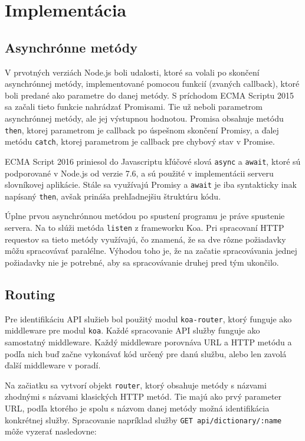 \documentclass[
  digital, %
  table,   %
  lof,     %
  lot,     %
]{fithesis3}
\begin{document}
\section{Implementácia}
\subsection{Asynchrónne metódy}
V prvotných verziách Node.js boli udalosti, ktoré sa volali po skončení asynchrónnej metódy, implementované pomocou funkcií (zvaných callback), ktoré boli predané ako parametre do danej metódy. S príchodom ECMA Scriptu 2015 sa začali tieto funkcie nahrádzať Promisami. Tie už neboli parametrom asynchrónnej metódy, ale jej výstupnou hodnotou. Promisa obsahuje metódu \texttt{then}, ktorej parametrom je callback po úspešnom skončení Promisy, a ďalej metódu \texttt{catch}, ktorej parametrom je callback pre chybový stav v Promise.

ECMA Script 2016 priniesol do Javascriptu kľúčové slová \texttt{async} a \texttt{await}, ktoré sú podporované v Node.js od verzie 7.6, a sú použité v implementácii serveru slovníkovej aplikácie. Stále sa využívajú Promisy a \texttt{await} je iba syntakticky inak napísaný \texttt{then}, avšak prináša prehľadnejšiu štruktúru kódu.

Úplne prvou asynchrónnou metódou po spustení programu je práve spustenie servera. Na to slúži metóda \texttt{listen} z frameworku Koa. Pri spracovaní HTTP requestov sa tieto metódy využívajú, čo znamená, že sa dve rôzne požiadavky môžu spracovávať paralélne. Výhodou toho je, že na začatie spracovávania jednej požiadavky nie je potrebné, aby sa spracovávanie druhej pred tým ukončilo.

\subsection{Routing}
Pre identifikáciu API služieb bol použitý modul \texttt{koa-router}, ktorý funguje ako middleware pre modul \texttt{koa}. Každé spracovanie API služby funguje ako samostatný middleware. Každý middleware porovnáva URL a HTTP metódu a podľa nich buď začne vykonávať kód určený pre danú službu, alebo len zavolá ďalší middleware v poradí.

Na začiatku sa vytvorí objekt \texttt{router}, ktorý obsahuje metódy s názvami zhodnými s názvami klasických HTTP metód. Tie majú ako prvý parameter URL, podľa ktorého je spolu s názvom danej metódy možná identifikácia konkrétnej služby. Spracovanie napríklad služby \texttt{GET api/dictionary/:name} môže vyzerať nasledovne:
\end{document}
